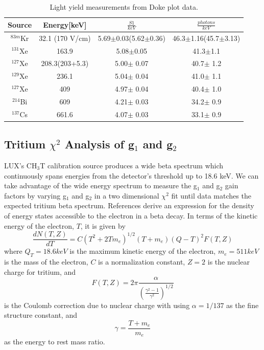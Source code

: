 \documentclass[a4paper,12pt]{article}
\begin{document}
{\begin{center}
\begin{table}[H]
\begin{tabular}{ | c | c | c | c |}
\hline
Source & Energy[keV] & $\frac{S1}{keV}$ & $\frac{photons}{keV}$ \\ \hline
$^{83m}$Kr & 32.1 (170 V/cm) & 5.69$\pm$0.03(5.62$\pm$0.36) & 46.3$\pm$1.16(45.7$\pm$3.13) \\  \hline
$^{131}$Xe & 163.9 & 5.08$\pm$0.05 & 41.3$\pm$1.1\\  \hline
$^{127}$Xe & 208.3(203+5.3) & 5.00$\pm$ 0.07 & 40.7$\pm$ 1.2\\  \hline
$^{129}$Xe & 236.1 & 5.04$\pm$ 0.04 & 41.0$\pm$ 1.1\\  \hline
$^{127}$Xe & 409 & 4.97$\pm$ 0.04 & 40.4$\pm$ 1.0\\  \hline
$^{214}$Bi & 609 & 4.21$\pm$ 0.03 & 34.2$\pm$ 0.9\\  \hline
$^{137}$Cs & 661.6 & 4.07$\pm$ 0.03 & 33.1$\pm$ 0.9\\ 
\hline
\end{tabular}
\caption{Light yield measurements from Doke plot data.}
\label{LY}
\end{table}
\end{center}


\subsection{Tritium $\chi^2$ Analysis of g$_1$ and g$_2$}

LUX's CH$_3$T calibration source produces a wide beta spectrum which continuously spans energies from the detector's threshold up to 18.6 keV.  We can take advantage of the wide energy spectrum to measure the g$_1$ and g$_2$ gain factors by varying g$_1$ and g$_2$ in a two dimensional $\chi^2$ fit until data matches the expected tritium beta spectrum.  References \cite{TritiumSpec,TritiumSpec2,TritiumSpec3} derive an expression for the density of energy states accessible to the electron in a beta decay.  In terms of the kinetic energy of the electron, $T$, it is given by
\begin{equation} \label{TritiumBetaShape}
\frac{dN(T,Z)}{dT} = C(T^2 + 2Tm_e)^{1/2}(T+m_e)(Q-T)^2F(T,Z)
\end{equation}
where $Q_T=18.6 keV$ is the maximum kinetic energy of the electron, $m_e=511 keV$ is the mass of the electron, $C$ is a normalization constant, $Z=2$ is the nuclear charge for tritium, and 
\begin{equation}
F(T,Z) = 2\pi \frac{\alpha}{\left( \frac{\gamma^2 -1 }{\gamma^2}\right) ^{1/2}} 
\end{equation}
is the Coulomb correction due to nuclear charge with using $\alpha=1/137$ as the fine structure constant, and
\begin{equation}
\gamma = \frac{T+m_e}{m_e}
\end{equation}
as the energy to rest mass ratio.

}
\end{document}

